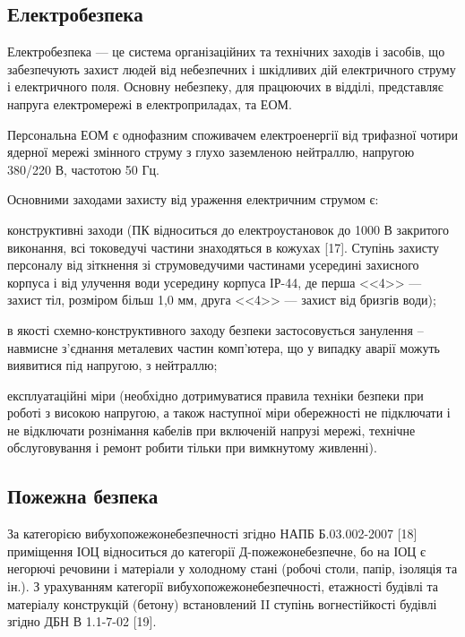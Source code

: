 \subsection{Електробезпека}
Електробезпека --- це система організаційних та технічних заходів і засобів, що забезпечують захист людей від небезпечних і шкідливих дій електричного струму і електричного поля. Основну небезпеку, для працюючих в відділі, представляє напруга електромережі в електроприладах, та ЕОМ.

Персональна ЕОМ є однофазним споживачем електроенергії від трифазної чотири ядерної мережі змінного струму з глухо заземленою нейтраллю, напругою 380/220 В, частотою 50 Гц.

Основними заходами захисту від ураження електричним струмом є:
\begin{longEnumerate}
\item конструктивні заходи (ПК відноситься до електроустановок до 1000 В закритого виконання, всі токоведучі частини знаходяться в кожухах [17]. Ступінь захисту персоналу від зіткнення зі струмоведучими частинами усередині захисного корпуса і від улучення води усередину корпуса ІР-44, де перша <<4>> --- захист тіл, розміром більш 1,0 мм, друга <<4>> --- захист від бризгів води);
\item в якості схемно-конструктивного заходу безпеки застосовується занулення – навмисне з’єднання металевих частин комп’ютера, що у випадку аварії можуть виявитися під напругою, з нейтраллю;
\item експлуатаційні міри (необхідно дотримуватися правила техніки безпеки при роботі з високою напругою, а також наступної міри обережності не підключати і не відключати рознімання кабелів при включеній напрузі мережі, технічне обслуговування і ремонт робити тільки при вимкнутому живленні).
\end{longEnumerate}

\subsection{Пожежна безпека}

За категорією вибухопожежонебезпечності згідно НАПБ Б.03.002-2007 [18] приміщення ІОЦ відноситься до категорії Д-пожежонебезпечне, бо на ІОЦ є негорючі речовини і матеріали у холодному стані (робочі столи, папір, ізоляція та ін.). З урахуванням категорії вибухопожежонебезпечності, етажності будівлі та матеріалу конструкцій (бетону) встановлений II ступінь вогнестійкості будівлі згідно ДБН В 1.1-7-02 [19].

